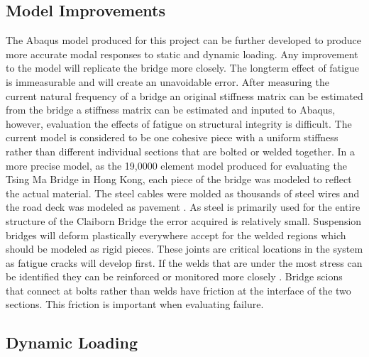 
\subsection{Model Improvements}

The Abaqus model produced for this project can be further developed to produce more accurate modal responses to static and dynamic loading. Any improvement to the model will replicate the bridge more closely. The longterm effect of fatigue is immeasurable and will create an unavoidable error. After measuring the current natural frequency of a bridge an original stiffness matrix can be estimated from the bridge a stiffness matrix can be estimated and inputed to Abaqus, however, evaluation the effects of fatigue on structural integrity is difficult.    
\indent The current model is considered to be one cohesive piece with a uniform stiffness rather than different individual sections that are bolted or welded together. In a more precise model, as the 19,0000 element model produced for evaluating the Tsing Ma Bridge in Hong Kong, each piece of the bridge was modeled to reflect the actual material. The steel cables were molded as thousands of steel wires and the road deck was modeled as pavement \cite{Chan}. As steel is primarily used for the entire structure of the Claiborn Bridge the error acquired is relatively small. 
\indent Suspension bridges will deform plastically everywhere accept for the welded regions which should be modeled as rigid pieces. These joints are critical locations in the system as fatigue cracks will develop first. If the welds that are under the most stress can be identified they can be reinforced or monitored more closely \cite{Chan}. Bridge scions that connect at bolts rather than welds have friction at the interface of the two sections. This friction is important when evaluating failure.

\subsection{Dynamic Loading} 

